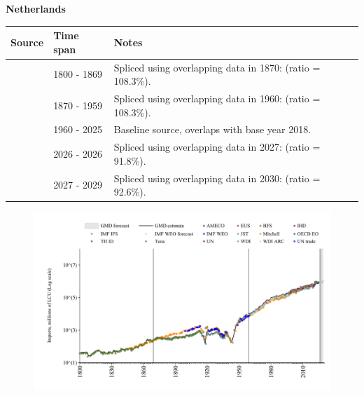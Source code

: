 \documentclass[12pt,a4paper,landscape]{article}
\begin{document}
\begin{adjustbox}{max totalsize={\paperwidth}{\paperheight},center}
\begin{minipage}[t][\textheight][t]{\textwidth}
\vspace*{0.5cm}
{}
\begin{center}
{\Large\bfseries Netherlands}
\end{center}
\vspace{0.5cm}
\begin{table}[H]
\centering
\small
\begin{tabular}{|l|l|l|}
\hline
\textbf{Source} & \textbf{Time span} & \textbf{Notes} \\
\hline
\rowcolor{white}\cite{Tena}& 1800 - 1869 &Spliced using overlapping data in 1870: (ratio = 108.3\%).\\
\rowcolor{lightgray}\cite{JST}& 1870 - 1959 &Spliced using overlapping data in 1960: (ratio = 108.3\%).\\
\rowcolor{white}\cite{OECD_EO}& 1960 - 2025 &Baseline source, overlaps with base year 2018.\\
\rowcolor{lightgray}\cite{AMECO}& 2026 - 2026 &Spliced using overlapping data in 2027: (ratio = 91.8\%).\\
\rowcolor{white}\cite{IMF_WEO_forecast}& 2027 - 2029 &Spliced using overlapping data in 2030: (ratio = 92.6\%).\\
\hline
\end{tabular}
\end{table}
\begin{figure}[H]
\centering
\includegraphics[width=\textwidth,height=0.6\textheight,keepaspectratio]{graphs/NLD_imports.pdf}
\end{figure}
\end{minipage}
\end{adjustbox}
\end{document}
